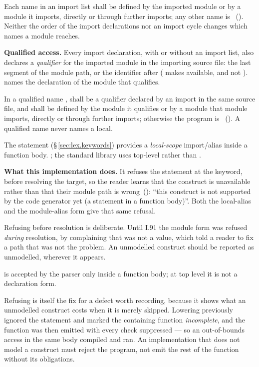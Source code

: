 \begin{constraint}
  Each name in an import list shall be defined by the imported module or by
  a module it imports, directly or through further imports; any other name is
  \illformed{}~().  Neither the order of the import declarations
  nor an import cycle changes which names a module reaches.
\end{constraint}

\pnum
\textbf{Qualified access.}  Every import declaration, with or without an
import list, also declares a \emph{qualifier} for the imported module in the
importing source file: the last segment of the module path, or the identifier
after  ( makes  available,
and not ).   names the declaration 
of the module that  qualifies.

\begin{constraint}
  In a qualified name ,  shall be a qualifier declared by
  an import in the same source file, and  shall be defined by the
  module it qualifies or by a module that module imports, directly or through
  further imports; otherwise the program is \illformed{}~().
  A qualified name never names a local.
\end{constraint}

\pnum
The  statement (\S\,\ref{sec:lex.keywords}) provides a
\emph{local-scope} import/alias inside a function body.  ; the standard library
uses top-level  rather than .

\begin{note}
  \textbf{What this implementation does.}  It refuses the statement at the  keyword,
  before resolving the target, so the reader learns that the construct is unavailable rather than
  that their module path is wrong~(): ``this construct is not supported by the code
  generator yet (a  statement in a function body)''.  Both the local-alias and the
  module-alias form give that same refusal.

  Refusing before resolution is deliberate.  Until I.91 the module form was refused \emph{during}
  resolution, by  complaining that  was not a value, which told a reader to
  fix a path that was not the problem.  An unmodelled construct should be reported as unmodelled,
  wherever it appears.

   is accepted by the parser only inside a function body; at top level it is not a
  declaration form.

  Refusing is itself the fix for a defect worth recording, because it shows what an unmodelled
  construct costs when it is merely skipped.  Lowering previously ignored the statement and
  marked the containing function \emph{incomplete}, and the function was then emitted with every
  check suppressed --- so an out-of-bounds access in the same body compiled and ran.  An
  implementation that does not model a construct must reject the program, not emit the rest of
  the function without its obligations.
\end{note}

